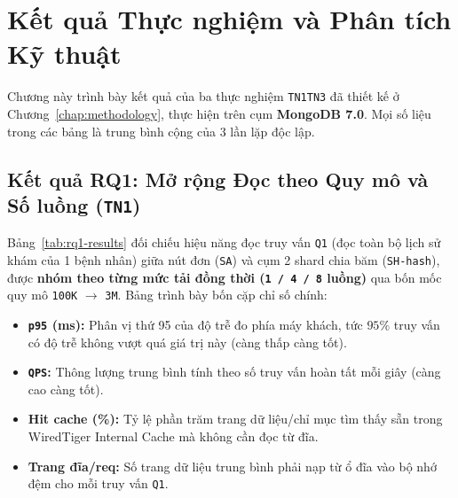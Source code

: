 \chapter{Kết quả Thực nghiệm và Phân tích Kỹ thuật}
\label{chap:results}

Chương này trình bày kết quả của ba thực nghiệm \texttt{TN1}\textendash \texttt{TN3} đã thiết kế ở Chương~\ref{chap:methodology}, thực hiện trên cụm \textbf{MongoDB 7.0}. Mọi số liệu trong các bảng là trung bình cộng của $3$ lần lặp độc lập.

\section{Kết quả RQ1: Mở rộng Đọc theo Quy mô và Số luồng (\texttt{TN1})}

Bảng~\ref{tab:rq1-results} đối chiếu hiệu năng đọc truy vấn \texttt{Q1} (đọc toàn bộ lịch sử khám của 1 bệnh nhân) giữa nút đơn (\texttt{SA}) và cụm 2 shard chia băm (\texttt{SH-hash}), được \textbf{nhóm theo từng mức tải đồng thời (\texttt{1 / 4 / 8} luồng)} qua bốn mốc quy mô \texttt{100K} $\rightarrow$ \texttt{3M}. Bảng trình bày bốn cặp chỉ số chính:
\begin{itemize}[leftmargin=0.8cm, itemsep=2pt]
  \item \textbf{\texttt{p95} (ms):} Phân vị thứ 95 của độ trễ đo phía máy khách, tức $95\%$ truy vấn có độ trễ không vượt quá giá trị này (càng thấp càng tốt).
  \item \textbf{\texttt{QPS}:} Thông lượng trung bình tính theo số truy vấn hoàn tất mỗi giây (càng cao càng tốt).
  \item \textbf{Hit cache (\%):} Tỷ lệ phần trăm trang dữ liệu/chỉ mục tìm thấy sẵn trong WiredTiger Internal Cache mà không cần đọc từ đĩa.
  \item \textbf{Trang đĩa/req:} Số trang dữ liệu trung bình phải nạp từ ổ đĩa vào bộ nhớ đệm cho mỗi truy vấn \texttt{Q1}.
\end{itemize}

